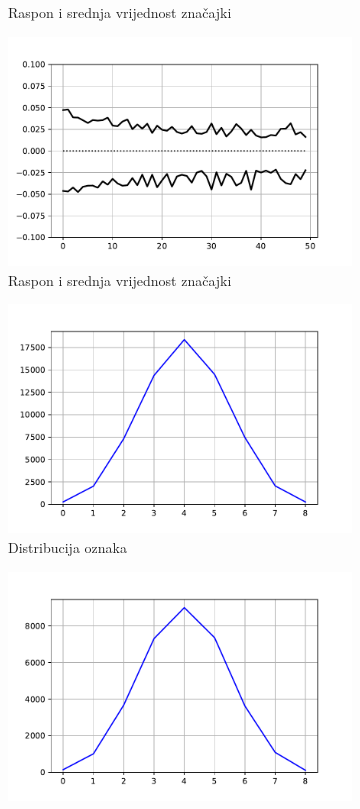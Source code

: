 \documentclass[times, utf8, numeric, diplomski]{fer}
\begin{document}
\begin{figure}[H]
\begin{subfigure}{.5\textwidth}
\centering
\caption{Raspon i srednja vrijednost značajki}
\label{fig:dpa4_train_inputs}
\end{subfigure}
\begin{subfigure}{.5\textwidth}
\includegraphics[width=\textwidth]{ds_nl9_ts_inputs.pdf}
\centering
\caption{Raspon i srednja vrijednost značajki}
\label{fig:dpa4_test_inputs}
\end{subfigure}
\begin{subfigure}{.5\textwidth}
\includegraphics[width=\textwidth]{ds_nl9_tr_outputs.pdf}
\centering
\caption{Distribucija oznaka}
\label{fig:dpa4_train_outputs}
\end{subfigure}
\begin{subfigure}{.5\textwidth}
\includegraphics[width=\textwidth]{ds_nl9_ts_outputs.pdf}

\end{subfigure}
\end{figure}
\end{document}
